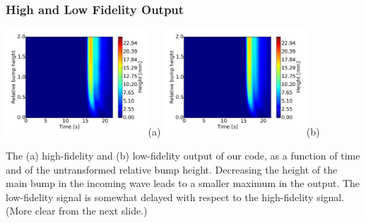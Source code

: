 \documentclass[11pt,ucs]{beamer}
\begin{document}
\begin{frame}\frametitle{High and Low Fidelity Output}

\begin{center}
\includegraphics[width=0.4\textwidth]{illustrate1d_data_hf}\textsf{(a)}
\includegraphics[width=0.4\textwidth]{illustrate1d_data_lf}\textsf{(b)}
\end{center}

\small{
The (a) high-fidelity and (b) low-fidelity output of our code, as a function of time and of the untransformed relative bump height. Decreasing the height of the main bump in the incoming wave leads to a smaller maximum in the output. The low-fidelity signal is somewhat delayed with respect to the high-fidelity signal. (More clear from the next slide.)}


\end{frame}
\end{document}
